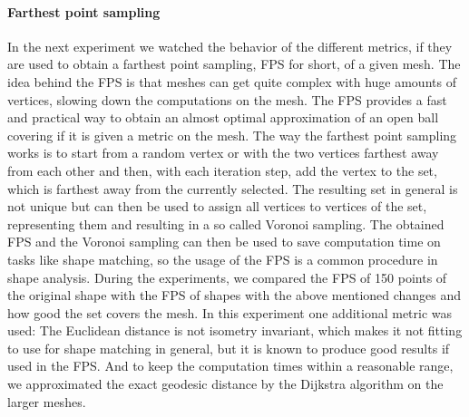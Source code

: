 \paragraph{Farthest point sampling}
In the next experiment we watched the behavior of the different metrics, if they are used to obtain a farthest point sampling, FPS for short, of a given mesh.
The idea behind the FPS is that meshes can get quite complex with huge amounts of vertices, slowing down the computations on the mesh.
The FPS provides a fast and practical way to obtain an almost optimal approximation of an open ball covering if it is given a metric on the mesh.
The way the farthest point sampling works is to start from a random vertex or with the two vertices farthest away from each other and then, with each iteration step, add the vertex to the set, which is farthest away from the currently selected.
The resulting set in general is not unique but can then be used to assign all vertices to vertices of the set, representing them and resulting in a so called Voronoi sampling.
The obtained FPS and the Voronoi sampling can then be used to save computation time on tasks like shape matching, so the usage of the FPS is a common procedure in shape analysis.
During the experiments, we compared the FPS of 150 points  of the original shape with the FPS of shapes with the above mentioned changes and how good the set covers the mesh.
In this experiment one additional metric was used:
The Euclidean distance is not isometry invariant, which makes it not fitting to use for shape matching in general, but it is known to produce good results if used in the FPS.
And to keep the computation times within a reasonable range, we approximated the exact geodesic distance by the Dijkstra algorithm on the larger meshes.

